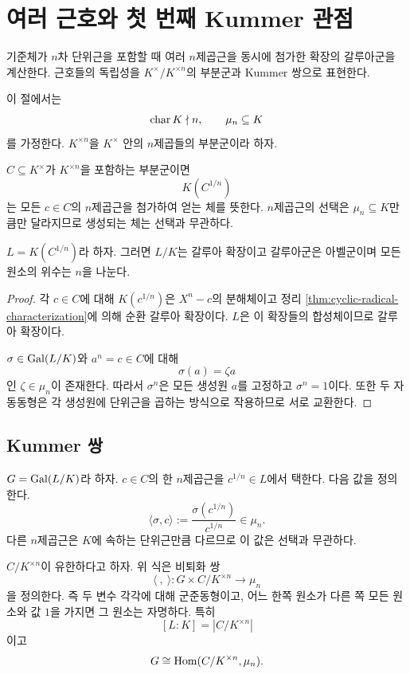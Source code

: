 \clearpage
\section{여러 근호와 첫 번째 Kummer 관점}
\label{sec:elementary-kummer-radicals}

\begin{learninggoal}
기준체가 $n$차 단위근을 포함할 때 여러 $n$제곱근을 동시에 첨가한 확장의 갈루아군을 계산한다. 근호들의 독립성을 $K^\times/K^{\times n}$의 부분군과 Kummer 쌍으로 표현한다.
\end{learninggoal}

이 절에서는
\[
  \operatorname{char} K\nmid n,
  \qquad
  \mu_n\subseteq K
\]
를 가정한다. $K^{\times n}$을 $K^\times$ 안의 $n$제곱들의 부분군이라 하자.

$C\subseteq K^\times$가 $K^{\times n}$을 포함하는 부분군이면
\[
  K(C^{1/n})
\]
는 모든 $c\in C$의 $n$제곱근을 첨가하여 얻는 체를 뜻한다. $n$제곱근의 선택은 $\mu_n\subseteq K$만큼만 달라지므로 생성되는 체는 선택과 무관하다.

\begin{proposition}
\label{prop:multiple-radicals-abelian}
$L=K(C^{1/n})$라 하자. 그러면 $L/K$는 갈루아 확장이고 갈루아군은 아벨군이며 모든 원소의 위수는 $n$을 나눈다.
\end{proposition}

\begin{proof}
각 $c\in C$에 대해 $K(c^{1/n})$은 $X^n-c$의 분해체이고 정리 \ref{thm:cyclic-radical-characterization}에 의해 순환 갈루아 확장이다. $L$은 이 확장들의 합성체이므로 갈루아 확장이다.

$\sigma\in\operatorname{Gal}(L/K)$와 $a^n=c\in C$에 대해
\[
  \sigma(a)=\zeta a
\]
인 $\zeta\in\mu_n$이 존재한다. 따라서 $\sigma^n$은 모든 생성원 $a$를 고정하고 $\sigma^n=1$이다. 또한 두 자동동형은 각 생성원에 단위근을 곱하는 방식으로 작용하므로 서로 교환한다.
\end{proof}

\subsection{Kummer 쌍}

$G=\operatorname{Gal}(L/K)$라 하자. $c\in C$의 한 $n$제곱근을 $c^{1/n}\in L$에서 택한다. 다음 값을 정의한다.
\[
  \langle\sigma,c\rangle
  :=\frac{\sigma(c^{1/n})}{c^{1/n}}
  \in\mu_n.
\]
다른 $n$제곱근은 $K$에 속하는 단위근만큼 다르므로 이 값은 선택과 무관하다.

\begin{theorem}[유한 Kummer 쌍]
\label{thm:finite-kummer-pairing}
$C/K^{\times n}$이 유한하다고 하자. 위 식은 비퇴화 쌍
\[
  \langle\ ,\ \rangle:
  G\times C/K^{\times n}\longrightarrow\mu_n
\]
을 정의한다. 즉 두 변수 각각에 대해 군준동형이고, 어느 한쪽 원소가 다른 쪽 모든 원소와 값 $1$을 가지면 그 원소는 자명하다. 특히
\[
  \boxed{
  [L:K]=|C/K^{\times n}|}
\]
이고
\[
  G\cong\operatorname{Hom}(C/K^{\times n},\mu_n).
\]
\end{theorem}

